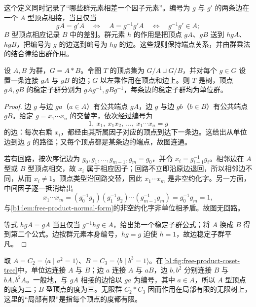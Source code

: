 \ProseParagraphBreak
这个定义同时记录了“哪些群元素相差一个因子元素”。编号为 \(g\) 与 \(g'\) 的两条边在一个 \(A\) 型顶点相接，当且仅当
\[
	gA=g'A \quad\Longleftrightarrow\quad A=g^{-1}g'A \quad\Longleftrightarrow\quad g^{-1}g'\in A;
\]
\(B\) 型顶点相应记录 \(B\) 中的差别。群元素 \(h\) 的作用是把顶点 \(gA\)、\(gB\) 送到 \(hgA\)、\(hgB\)，把编号为 \(g\) 的边送到编号为 \(hg\) 的边。这些规则保持端点关系，并由群乘法的结合律给出群作用。

\begin{proposition}\label{b1:prop:free-product-coset-tree}
	设 \(A,B\) 为群，\(G=A*B\)。令图 \(T\) 的顶点集为 \(G/A\sqcup G/B\)，并对每个 \(g\in G\) 设置一条连接 \(gA\) 与 \(gB\) 的边；\(G\) 以左乘作用在顶点和边上。则 \(T\) 是树，顶点 \(gA,gB\) 的稳定子群分别为 \(gAg^{-1},gBg^{-1}\)，每条边的稳定子群均为单位群。
\end{proposition}

\begin{proof}
	边 \(g\) 与边 \(ga\)（\(a\in A\)）有公共端点 \(gA\)，边 \(g\) 与边 \(gb\)（\(b\in B\)）有公共端点 \(gB\)。给定 \(g=x_1\cdots x_n\) 的交替字，依次经过编号为
	\[
		1,\ x_1,\ x_1x_2,\ \ldots,\ x_1\cdots x_n=g
	\]
	的边：每次右乘 \(x_i\)，都经由其所属因子对应的顶点到达下一条边。这给出从单位边到边 \(g\) 的路径；又每个顶点都是某条边的端点，故图连通。

	若有回路，按次序记边为 \(g_0,g_1,\ldots,g_{m-1},g_m=g_0\)，并令 \(x_i=g_{i-1}^{-1}g_i\)。相邻边在 \(A\) 型或 \(B\) 型顶点相交，故 \(x_i\) 属于相应因子；回路不立即沿原边退回，所以相邻边不同，从而 \(x_i\ne1\)。顶点类型沿回路交替，因此 \(x_1\cdots x_m\) 是非空约化字。另一方面，中间因子逐一抵消给出
	\[
		x_1\cdots x_m =(g_0^{-1}g_1)(g_1^{-1}g_2)\cdots(g_{m-1}^{-1}g_m) =g_0^{-1}g_m=1,
	\]
	与\cref{b1:lem:free-product-normal-form}的非空约化字非单位相矛盾。故图无回路。

	等式 \(hgA=gA\) 当且仅当 \(g^{-1}hg\in A\)，给出第一个稳定子群公式；将 \(A\) 换成 \(B\) 得到第二个公式。边按群元素本身编号，\(hg=g\) 迫使 \(h=1\)，故边稳定子群平凡。
\end{proof}

取 \(A=C_2=\langle a\mid a^2=1\rangle\)、\(B=C_3=\langle b\mid b^3=1\rangle\)。在\cref{b1:fig:free-product-coset-tree}中，单位边连接 \(A\) 与 \(B\)；边 \(a\) 连接 \(A\) 与 \(aB\)，边 \(b,b^2\) 分别连接 \(B\) 与 \(bA,b^2A\)。一般地，与 \(gA\) 相接的边恰以 \(ga\) 为编号，其中 \(a\in A\)，所以 \(A\) 型顶点的度为二；\(B\) 型顶点的度为三。无限群 \(C_2*C_3\) 因而作用在局部有限的无限树上，这里的“局部有限”是指每个顶点的度都有限。

